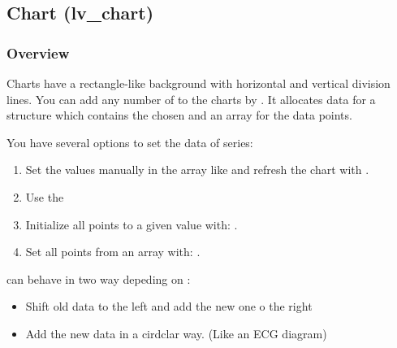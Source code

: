 \documentclass[letterpaper,10pt,english]{sphinxmanual}
\begin{document}
\subsection{Chart (lv\_chart)}
\label{\detokenize{object-types/chart:chart-lv-chart}}\label{\detokenize{object-types/chart::doc}}

\subsubsection{Overview}
\label{\detokenize{object-types/chart:overview}}
Charts have a rectangle-like background with horizontal and vertical division lines. You can add any number of  to the charts by .
It allocates data for a  structure which contains the chosen  and an array for the data points.

You have several options to set the data of series:
\begin{enumerate}
\def\theenumi{\arabic{enumi}}
\def\labelenumi{\theenumi .}
\makeatletter\def\p@enumii{\p@enumi \theenumi .}\makeatother
\item {} 
Set the values manually in the array like  and refresh the chart with .

\item {} 
Use the 

\item {} 
Initialize all points to a given value with: .

\item {} 
Set all points from an array with: .

\end{enumerate}

 can behave in two way depeding on :
\begin{itemize}
\item {} 
 Shift old data to the left and add the new one o the right

\item {} 
 Add the new data in a cirdclar way. (Like an ECG diagram)

\end{itemize}
\end{document}
